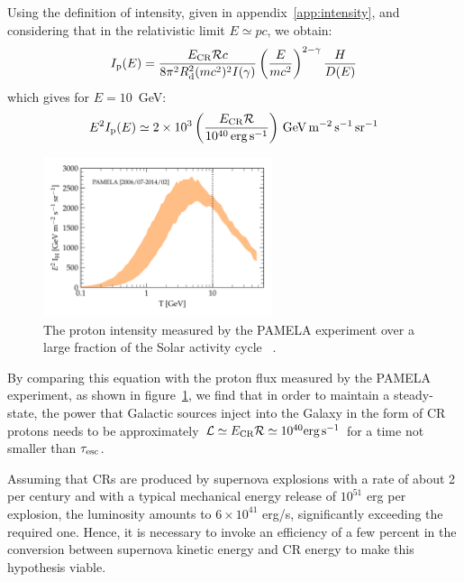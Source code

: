 Using the definition of intensity, given in appendix~\ref{app:intensity}, and considering that in the relativistic limit $E \simeq p c$, we obtain:
%
\begin{equation}
I_{\rm p}(E) = \frac{E_{\rm CR} \mathcal R c}{8 \pi^2 R_{\rm d}^2 (m c^2)^2 I(\gamma)} \left( \frac{E}{mc^2}\right)^{2-\gamma} \frac{H}{D(E)}
\end{equation}
%
which gives for $E = 10$~GeV:
%
\begin{equation}
E^2 I_{\rm p}(E) \simeq 2 \times 10^3 \left(\frac{E_{\rm CR} \mathcal R}{10^{40} \, \text{erg} \, \text{s}^{-1}}\right) \, \text{GeV} \, \text{m}^{-2} \, \text{s}^{-1} \, \text{sr}^{-1}
\end{equation}

\begin{figure}[t]
\centering
\includegraphics[width=0.6\textwidth]{figures/protons_le.pdf}
\caption{The proton intensity measured by the PAMELA experiment over a large fraction of the Solar activity cycle ~\cite{PAMELA.2011.proton}.}
\label{fig:pamelaprotons}
\end{figure}

By comparing this equation with the proton flux measured by the PAMELA experiment, as shown in figure~\ref{fig:pamelaprotons}, we find that in order to maintain a steady-state, the power that Galactic sources inject into the Galaxy in the form of CR protons needs to be approximately $\mathcal L \simeq E_{\rm CR} \mathcal R \simeq 10^{40} \text{erg} \, \text{s}^{-1}$ for a time not smaller than $\tau_{\rm esc}$.

Assuming that CRs are produced by supernova explosions with a rate of about 2 per century and with a typical mechanical energy release of $10^{51}$ erg per explosion, the luminosity amounts to $6 \times 10^{41}$ erg/s, significantly exceeding the required one. Hence, it is necessary to invoke an efficiency of a few percent in the conversion between supernova kinetic energy and CR energy to make this hypothesis viable.

